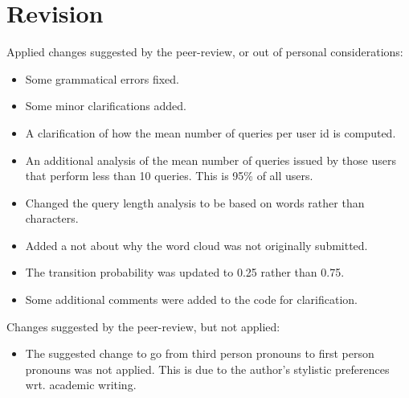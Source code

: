 
\section{Revision}

Applied changes suggested by the peer-review, or out of personal
considerations:

\begin{itemize}

\item Some grammatical errors fixed.

\item Some minor clarifications added.

\item A clarification of how the mean number of queries per user id is
computed.

\item An additional analysis of the mean number of queries issued by those
users that perform less than 10 queries. This is 95\% of all users.

\item Changed the query length analysis to be based on words rather than
characters.

\item Added a not about why the word cloud was not originally submitted.

\item The transition probability was updated to 0.25 rather than 0.75.

\item Some additional comments were added to the code for clarification.

\end{itemize}

Changes suggested by the peer-review, but not applied:

\begin{itemize}

\item The suggested change to go from third person pronouns to first person
pronouns was not applied. This is due to the author's stylistic preferences
wrt. academic writing.

\end{itemize}

